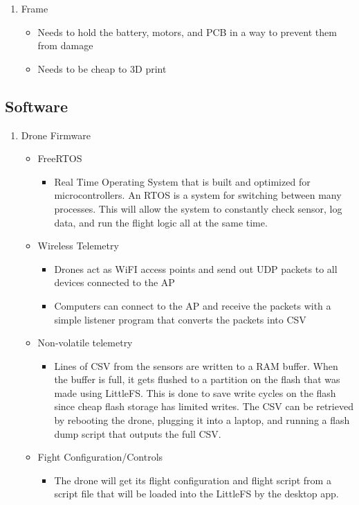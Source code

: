 \documentclass[12pt, titlepage]{article}
\begin{document}
\begin{enumerate}
\item Frame
\begin{itemize}
\item Needs to hold the battery, motors, and PCB in a way to prevent them from damage
\item Needs to be cheap to 3D print
\end{itemize}

\end{enumerate}

\subsection{Software}
\begin{enumerate}
	\item Drone Firmware
	\begin{itemize}
		\item FreeRTOS
		\begin{itemize}
			\item Real Time Operating System that is built and optimized for microcontrollers. An RTOS is a system for switching between many processes. This will allow the system to constantly check sensor, log data, and run the flight logic all at the same time.
		\end{itemize}
		\item Wireless Telemetry
		\begin{itemize}
			\item Drones act as WiFI access points and send out UDP packets to all devices connected to the AP
			\item Computers can connect to the AP and receive the packets with a simple listener program that converts the packets into CSV
		\end{itemize}
		\item Non-volatile telemetry
		\begin{itemize}
			\item Lines of CSV from the sensors are written to a RAM buffer. When the buffer is full, it gets flushed to a partition on the flash that was made using LittleFS. This is done to save write cycles on the flash since cheap flash storage has limited writes. The CSV can be retrieved by rebooting the drone, plugging it into a laptop, and running a flash dump script that outputs the full CSV.
		\end{itemize}
		\item Fight Configuration/Controls
		\begin{itemize}
			\item The drone will get its flight configuration and flight script from a script file that will be loaded into the LittleFS by the desktop app. 

\end{itemize}
\end{itemize}
\end{enumerate}
\end{document}
